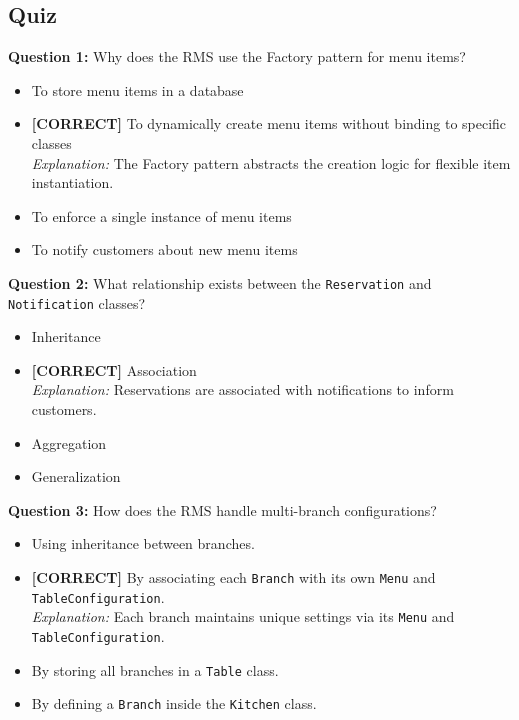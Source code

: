 \subsection*{Quiz}
\vspace{0.3cm}
\noindent
\textbf{Question 1:} Why does the RMS use the Factory pattern for menu items?
\\[0.2cm]
\begin{itemize}
 \item To store menu items in a database
 \item \textbf{[CORRECT]} To dynamically create menu items without binding to specific classes
\\[0.1cm]
\textit{Explanation:} 
The Factory pattern abstracts the creation logic for flexible item instantiation.
 \item To enforce a single instance of menu items
 \item To notify customers about new menu items
\end{itemize}
\vspace{0.3cm}
\noindent
\textbf{Question 2:} What relationship exists between the \texttt{Reservation} and \texttt{Notification} classes?
\\[0.2cm]
\begin{itemize}
 \item Inheritance
 \item \textbf{[CORRECT]} Association
\\[0.1cm]
\textit{Explanation:} 
Reservations are associated with notifications to inform customers.
 \item Aggregation
 \item Generalization
\end{itemize}
\vspace{0.3cm}
\noindent
\textbf{Question 3:} How does the RMS handle multi-branch configurations?
\\[0.2cm]
\begin{itemize}
 \item Using inheritance between branches.
 \item \textbf{[CORRECT]} By associating each \texttt{Branch} with its own \texttt{Menu} and \texttt{TableConfiguration}.
\\[0.1cm]
\textit{Explanation:} 
Each branch maintains unique settings via its \texttt{Menu} and \texttt{TableConfiguration}.
 \item By storing all branches in a \texttt{Table} class.
 \item By defining a \texttt{Branch} inside the \texttt{Kitchen} class.
\end{itemize}
